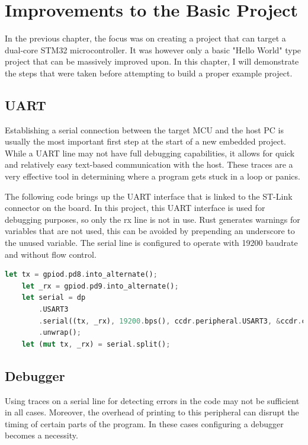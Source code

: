 \chapter{Improvements to the Basic Project}

In the previous chapter, the focus was on creating a project that can target a dual-core STM32 microcontroller. It was however only a basic "Hello World" type project that can be massively improved upon. In this chapter, I will demonstrate the steps that were taken before attempting to build a proper example project.

\section{UART}

Establishing a serial connection between the target MCU and the host PC is usually the most important first step at the start of a new embedded project. While a UART line may not have full debugging capabilities, it allows for quick and relatively easy text-based communication with the host. These traces are a very effective tool in determining where a program gets stuck in a loop or panics.

The following code brings up the UART interface that is linked to the ST-Link connector on the board. In this project, this UART interface is used for debugging purposes, so only the rx line is not in use. Rust generates warnings for variables that are not used, this can be avoided by prepending an underscore to the unused variable. The serial line is configured to operate with 19200 baudrate and without flow control.

\begin{lstlisting}[language=Rust,frame=single,float=!ht,style=customrust,label={lst:uart-bringup},caption={UART Interface Configuration}]
    let tx = gpiod.pd8.into_alternate();
    let _rx = gpiod.pd9.into_alternate();
    let serial = dp
        .USART3
        .serial((tx, _rx), 19200.bps(), ccdr.peripheral.USART3, &ccdr.clocks)
        .unwrap();
    let (mut tx, _rx) = serial.split();
\end{lstlisting}

\section{Debugger}

Using traces on a serial line for detecting errors in the code may not be sufficient in all cases. Moreover, the overhead of printing to this peripheral can disrupt the timing of certain parts of the program. In these cases configuring a debugger becomes a necessity.

